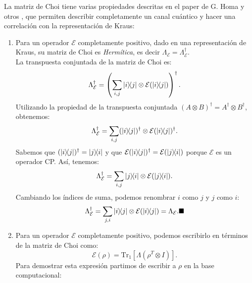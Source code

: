 \documentclass[letterpaper,12pt]{thesisECFM}
\theoremstyle{plain}
\theoremstyle{definition}
\theoremstyle{definition}
\theoremstyle{remark}
\newcommand{\1}{\mathbb{1}}
\begin{document}
La matriz de Choi tiene  varias propiedades descritas en el paper de  G. Homa  y otros \cite{Choi2024},  que permiten describir completamente un canal cuántico y hacer una correlación con la representación de Kraus:
\begin{enumerate}
     \item Para un operador $\mathcal{E}$ completamente positivo, dado en una representación de Kraus, su matriz de Choi es \textit{Hermítica}, es decir $\Lambda_{\mathcal{E}} = \Lambda_{\mathcal{E}}^{\dagger}$.\\ 
        La transpuesta conjuntada de la matriz de Choi es: 
        \begin{equation*}
            \Lambda_{\mathcal{E}}^\dagger = \left( \sum_{i,j} \ketbra{i}{j} \otimes \mathcal{E}(\ketbra{i}{j}) \right)^\dagger.
        \end{equation*}
        Utilizando la propiedad de la transpuesta conjuntada $(A \otimes B)^\dagger = A^\dagger \otimes B^\dagger$, obtenemos:
        \begin{equation}
          \Lambda_{\mathcal{E}}^\dagger = \sum_{i,j} (\ketbra{i}{j})^\dagger \otimes \mathcal{E}(\ketbra{i}{j})^\dagger.  
        \end{equation}
        Sabemos que $(\ketbra{i}{j})^\dagger = \ketbra{j}{i}$ y que $\mathcal{E}(\ketbra{i}{j})^\dagger = \mathcal{E}(\ketbra{j}{i})$ porque $\mathcal{E}$ es un operador CP. Así, tenemos:
        \begin{equation}
         \Lambda_{\mathcal{E}}^\dagger = \sum_{i,j} \ketbra{j}{i} \otimes \mathcal{E}(\ketbra{j}{i}).   
        \end{equation}
        Cambiando los índices de suma, podemos renombrar $i$ como $j$ y $j$ como $i$:
        \begin{equation}
           \Lambda_{\mathcal{E}}^\dagger = \sum_{j,i} \ketbra{i}{j} \otimes \mathcal{E}(\ketbra{i}{j}) = \Lambda_{\mathcal{E}}. \blacksquare
        \end{equation}
    \item Para un operador $\mathcal{E}$ completamente positivo, podemos escribirlo en términos de la matriz de Choi como:
            \begin{equation}\label{ec:canal_choi_form}
            \mathcal{E} (\rho) = \text{Tr}_1 [ \Lambda ( \rho^{T} \otimes I)] .
            \end{equation}
            Para demostrar esta expresión partimos de escribir a  $\rho$ en la base computacional:
        \begin{equation} \label{ec:densidad_computacional}

\end{equation}
\end{enumerate}
\end{document}
